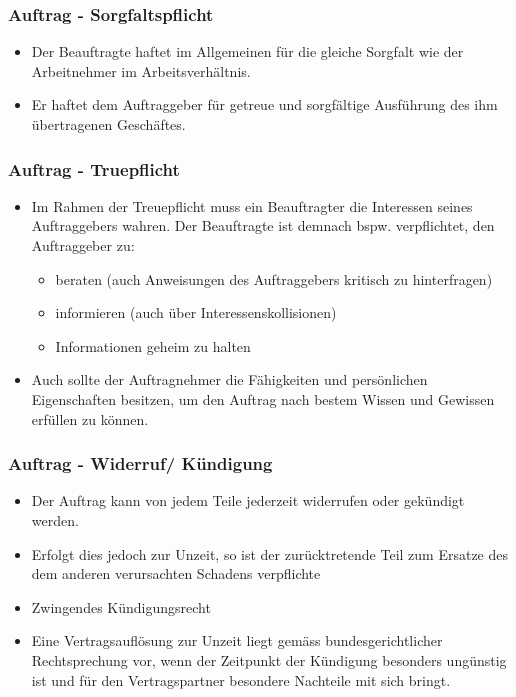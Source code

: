 \subsubsection{Auftrag - Sorgfaltspflicht}
\begin{itemize}
    \item Der Beauftragte haftet im Allgemeinen für die gleiche Sorgfalt wie der Arbeitnehmer im Arbeitsverhältnis.
    \item Er haftet dem Auftraggeber für getreue und sorgfältige Ausführung des ihm übertragenen Geschäftes.
\end{itemize}

\subsubsection{Auftrag - Truepflicht}
\begin{itemize}
    \item Im Rahmen der Treuepflicht muss ein Beauftragter die Interessen seines Auftraggebers wahren. Der Beauftragte ist demnach bspw. verpflichtet, den Auftraggeber zu:
    \begin{itemize}
        \item beraten (auch Anweisungen des Auftraggebers kritisch zu hinterfragen)
        \item informieren (auch über Interessenskollisionen)
        \item Informationen geheim zu halten
    \end{itemize}
    \item Auch sollte der Auftragnehmer die Fähigkeiten und persönlichen Eigenschaften besitzen, um den Auftrag nach bestem Wissen und Gewissen erfüllen zu können.
\end{itemize}

\subsubsection{Auftrag - Widerruf/ Kündigung}
\begin{itemize}
    \item Der Auftrag kann von jedem Teile jederzeit widerrufen oder gekündigt werden.
    \item Erfolgt dies jedoch zur Unzeit, so ist der zurücktretende Teil zum Ersatze des dem anderen verursachten Schadens verpflichte
    \item Zwingendes Kündigungsrecht
    \item Eine Vertragsauflösung zur Unzeit liegt gemäss bundesgerichtlicher Rechtsprechung vor, wenn der Zeitpunkt der Kündigung besonders ungünstig ist und für den Vertragspartner besondere Nachteile mit sich bringt.
\end{itemize}